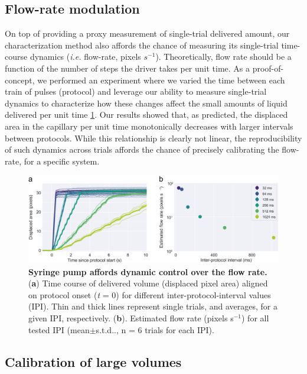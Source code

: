 \subsection*{Flow-rate modulation}
On top of providing a proxy measurement of single-trial delivered amount, our characterization method also affords the chance of measuring its single-trial time-course dynamics (\textit{i.e.} flow-rate, pixels $s^{-1}$). Theoretically, flow rate should be a function of the number of steps the driver takes per unit time. As a proof-of-concept, we performed an experiment where we varied the time between each train of pulses (protocol) and leverage our ability to measure single-trial dynamics to characterize how these changes affect the small amounts of liquid delivered per unit time \ref{fig:FlowRateControl}. Our results showed that, as predicted, the displaced area in the capillary per unit time monotonically decreases with larger intervals between protocols. While this relationship is clearly not linear, the reproducibility of such dynamics across trials affords the chance of precisely calibrating the flow-rate, for a specific system.

\begin{figure}
	\centering
	\includegraphics[width=1.0\linewidth]{Figures/Artboard 3.pdf}
	\caption{\textbf{Syringe pump affords dynamic control over the flow rate.}\\
		(\textbf{a}) Time course of delivered volume (displaced pixel area) aligned on protocol onset (\textit{t} = 0) for different inter-protocol-interval values (IPI). Thin and thick lines represent single trials, and averages, for a given IPI, respectively. (\textbf{b}). Estimated flow rate (pixels s$^{-1}$) for all tested IPI (mean$\pm$s.t.d.., n = 6 trials for each IPI).}
	\label{fig:FlowRateControl} 
\end{figure}

\subsection*{Calibration of large volumes}


